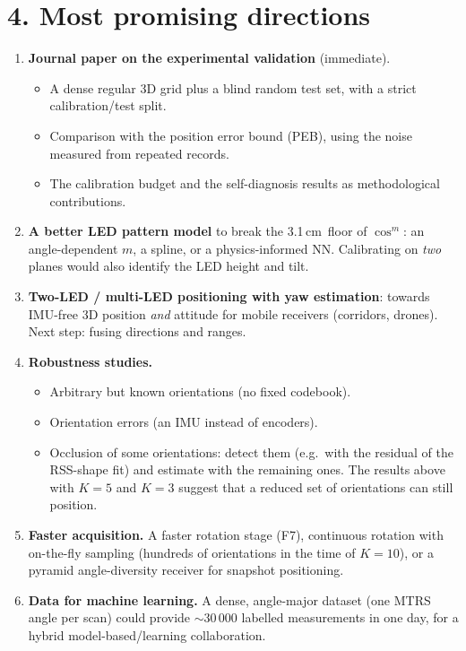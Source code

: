 \documentclass[10.5pt,a4paper]{article}
\newcommand{\cm}{\,cm}
\begin{document}
\section*{4. Most promising directions}
\begin{enumerate}[leftmargin=6mm]
\item \textbf{Journal paper on the experimental validation} (immediate).
  \begin{itemize}
  \item A dense regular 3D grid plus a blind random test set, with a strict calibration/test split.
  \item Comparison with the position error bound (PEB), using the noise measured from repeated
    records.
  \item The calibration budget and the self-diagnosis results as methodological contributions.
  \end{itemize}
\item \textbf{A better LED pattern model} to break the 3.1\cm\ floor of $\cos^m$: an angle-dependent
  $m$, a spline, or a physics-informed NN. Calibrating on \emph{two} planes would also identify the LED
  height and tilt.
\item \textbf{Two-LED / multi-LED positioning with yaw estimation}: towards IMU-free 3D position
  \emph{and} attitude for mobile receivers (corridors, drones). Next step: fusing directions and
  ranges.
\item \textbf{Robustness studies.}
  \begin{itemize}
  \item Arbitrary but known orientations (no fixed codebook).
  \item Orientation errors (an IMU instead of encoders).
  \item Occlusion of some orientations: detect them (e.g.\ with the residual of the RSS-shape fit) and
    estimate with the remaining ones. The results above with $K=5$ and $K=3$ suggest that a reduced
    set of orientations can still position.
  \end{itemize}
\item \textbf{Faster acquisition.} A faster rotation stage (F7), continuous rotation with on-the-fly
  sampling (hundreds of orientations in the time of $K=10$), or a pyramid angle-diversity receiver for
  snapshot positioning.
\item \textbf{Data for machine learning.} A dense, angle-major dataset (one MTRS angle per scan) could
  provide $\sim$30\,000 labelled measurements in one day, for a hybrid model-based/learning
  collaboration.
\end{enumerate}
\end{document}
